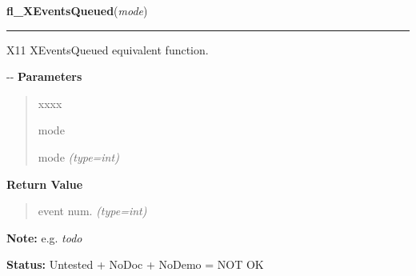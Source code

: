 \hspace{.8\funcindent}\begin{boxedminipage}{\funcwidth}

    \raggedright \textbf{fl\_XEventsQueued}(\textit{mode})

    \vspace{-1.5ex}

    \rule{\textwidth}{0.5\fboxrule}
\setlength{\parskip}{2ex}

X11 XEventsQueued equivalent function.

-{}-
\setlength{\parskip}{1ex}
      \textbf{Parameters}
      \vspace{-1ex}

      \begin{quote}
        \begin{Ventry}{xxxx}

          \item[mode]


mode
            {\it (type=int)}

        \end{Ventry}

      \end{quote}

      \textbf{Return Value}
    \vspace{-1ex}

      \begin{quote}

event num.
      {\it (type=int)}

      \end{quote}

\textbf{Note:} 
e.g. \emph{todo}


\textbf{Status:} 
Untested + NoDoc + NoDemo = NOT OK


    \end{boxedminipage}

    \label{xformslib:flxbasic:fl_XPutBackEvent}

    \vspace{0.5ex}

